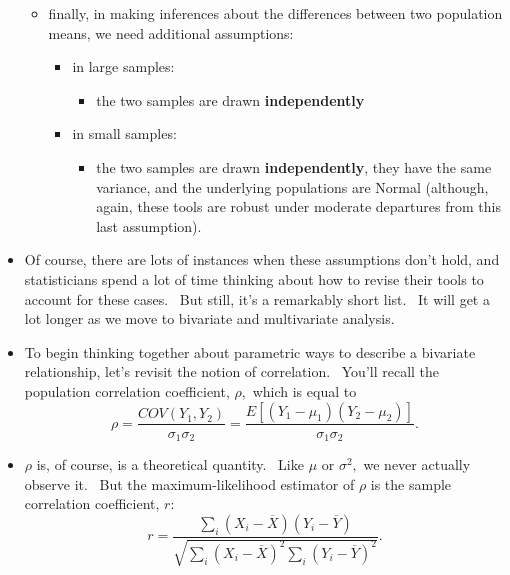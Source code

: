 \documentclass[11pt]{article}
\begin{document}
\begin{itemize}
\begin{itemize}
\item finally, in making inferences about the differences between two
population means, we need additional assumptions:

\begin{itemize}
\item in large samples:

\begin{itemize}
\item the two samples are drawn \textbf{independently}
\end{itemize}

\item in small samples:

\begin{itemize}
\item the two samples are drawn \textbf{independently}, they have the same
variance, and the underlying populations are Normal (although, again, these
tools are robust under moderate departures from this last assumption).
\end{itemize}
\end{itemize}
\end{itemize}

\item Of course, there are lots of instances when these assumptions don't
hold, and statisticians spend a lot of time thinking about how to revise
their tools to account for these cases. \ But still, it's a remarkably short
list. \ It will get a lot longer as we move to bivariate and multivariate
analysis.

\item To begin thinking together about parametric ways to describe a
bivariate relationship, let's revisit the notion of correlation. \ You'll
recall the population correlation coefficient, $\rho ,$ which is equal to%
\begin{equation*}
\rho =\frac{COV(Y_{1},Y_{2})}{\sigma _{1}\sigma _{2}}=\frac{E\left[
(Y_{1}-\mu _{1})(Y_{2}-\mu _{2})\right] }{\sigma _{1}\sigma _{2}}.
\end{equation*}

\item $\rho $ is, of course, is a theoretical quantity. \ Like $\mu $ or $%
\sigma ^{2},$ we never actually observe it. \ But the maximum-likelihood
estimator of $\rho $ is the sample correlation coefficient, $r:$%
\begin{equation*}
r=\frac{\sum\nolimits_{i}\left( X_{i}-\overline{X}\right) \left( Y_{i}-%
\overline{Y}\right) }{\sqrt{\sum\nolimits_{i}\left( X_{i}-\overline{X}%
\right) ^{2}\sum\nolimits_{i}\left( Y_{i}-\overline{Y}\right) ^{2}}}.
\end{equation*}
\end{itemize}
\end{document}
